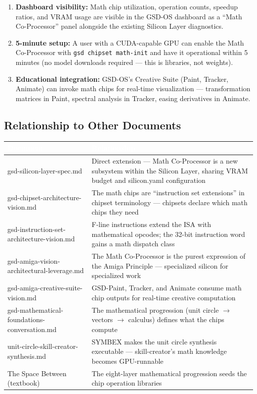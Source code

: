 \documentclass[11pt,letterpaper]{article}
\newcommand{\tableheader}[1]{\textbf{\sffamily\textcolor{white}{#1}}}
\begin{document}
\begin{enumerate}[leftmargin=2em]
\item \textbf{Dashboard visibility:} Math chip utilization, operation counts, speedup ratios, and VRAM usage are visible in the GSD-OS dashboard as a ``Math Co-Processor'' panel alongside the existing Silicon Layer diagnostics.

\item \textbf{5-minute setup:} A user with a CUDA-capable GPU can enable the Math Co-Processor with \texttt{gsd chipset math-init} and have it operational within 5 minutes (no model downloads required --- this is libraries, not weights).

\item \textbf{Educational integration:} GSD-OS's Creative Suite (Paint, Tracker, Animate) can invoke math chips for real-time visualization --- transformation matrices in Paint, spectral analysis in Tracker, easing derivatives in Animate.
\end{enumerate}

\subsection{Relationship to Other Documents}

\begin{center}
\begin{tabularx}{\textwidth}{L{4.5cm}X}
\toprule
{}
\tableheader{Document} & \tableheader{Relationship} \\
\midrule
gsd-silicon-layer-spec.md & Direct extension --- Math Co-Processor is a new subsystem within the Silicon Layer, sharing VRAM budget and silicon.yaml configuration \\
gsd-chipset-architecture-vision.md & The math chips are ``instruction set extensions'' in chipset terminology --- chipsets declare which math chips they need \\
gsd-instruction-set-architecture-vision.md & F-line instructions extend the ISA with mathematical opcodes; the 32-bit instruction word gains a math dispatch class \\
gsd-amiga-vision-architectural-leverage.md & The Math Co-Processor is the purest expression of the Amiga Principle --- specialized silicon for specialized work \\
gsd-amiga-creative-suite-vision.md & GSD-Paint, Tracker, and Animate consume math chip outputs for real-time creative computation \\
gsd-mathematical-foundations-conversation.md & The mathematical progression (unit circle $\rightarrow$ vectors $\rightarrow$ calculus) defines what the chips compute \\
unit-circle-skill-creator-synthesis.md & SYMBEX makes the unit circle synthesis executable --- skill-creator's math knowledge becomes GPU-runnable \\
The Space Between (textbook) & The eight-layer mathematical progression seeds the chip operation libraries \\
\bottomrule
\end{tabularx}
\end{center}
\end{document}
